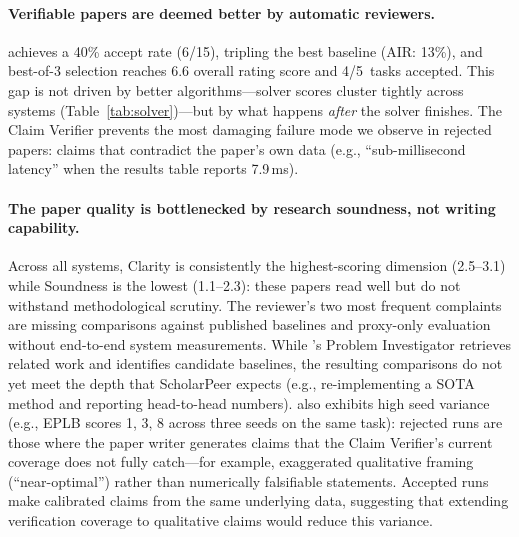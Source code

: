 \paragraph{Verifiable papers are deemed better by automatic reviewers.}
\sys{} achieves a 40\% accept rate (6/15), tripling the best baseline (AIR: 13\%), and best-of-3 selection reaches 6.6 overall rating score and 4/5~tasks accepted.
This gap is not driven by better algorithms---solver scores cluster tightly across systems (Table~\ref{tab:solver})---but by what happens \emph{after} the solver finishes.
The Claim Verifier prevents the most damaging failure mode we observe in rejected papers: claims that contradict the paper's own data (e.g., ``sub-millisecond latency'' when the results table reports 7.9\,ms).

\paragraph{The paper quality is bottlenecked by research soundness, not writing capability.}
Across all systems, Clarity is consistently the highest-scoring dimension (2.5--3.1) while Soundness is the lowest (1.1--2.3): these papers read well but do not withstand methodological scrutiny.
The reviewer's two most frequent complaints are missing comparisons against published baselines and proxy-only evaluation without end-to-end system measurements. While \sys{}'s Problem Investigator retrieves related work and identifies candidate baselines, the resulting comparisons do not yet meet the depth that ScholarPeer expects (e.g., re-implementing a SOTA method and reporting head-to-head numbers).
\sys{} also exhibits high seed variance (e.g., EPLB scores 1, 3, 8 across three seeds on the same task): rejected runs are those where the paper writer generates claims that the Claim Verifier's current coverage does not fully catch---for example, exaggerated qualitative framing (``near-optimal'') rather than numerically falsifiable statements.
Accepted runs make calibrated claims from the same underlying data, suggesting that extending verification coverage to qualitative claims would reduce this variance.




